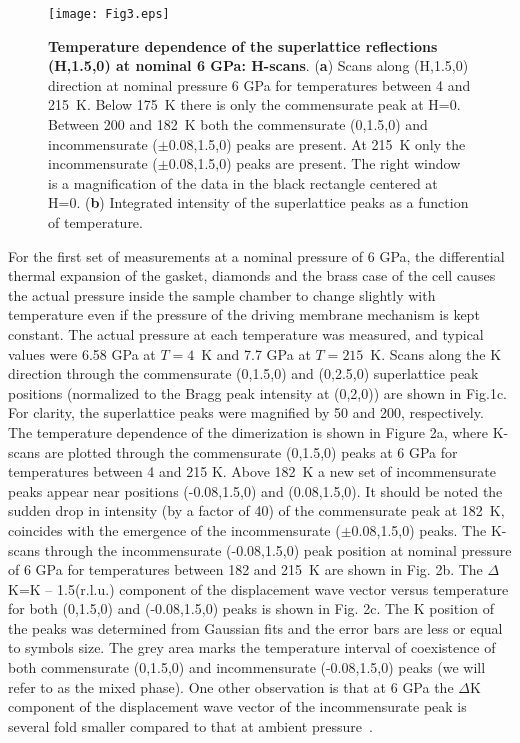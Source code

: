 \documentclass[preprint,superscriptaddress,amsmath,amssymb,aps,prl]{revtex4-1}
\begin{document}
\begin{center}
\begin{figure}
\begin{center}
\texttt{[image: Fig3.eps]}
\caption{\textbf{Temperature dependence of the superlattice reflections (H,1.5,0) at nominal 6 GPa: H-scans}. (\textbf{a}) Scans along (H,1.5,0) direction at nominal pressure 6 GPa for temperatures between 4 and 215~K. Below 175~K there is only the commensurate peak at H=0. Between 200 and 182~K both the commensurate (0,1.5,0) and incommensurate ($\pm$0.08,1.5,0) peaks are present. At 215~K only the incommensurate ($\pm$0.08,1.5,0) peaks are present. The right window is a magnification of the data in the black rectangle centered at H=0. (\textbf{b}) Integrated intensity of the superlattice peaks as a function of temperature.}
\label{fig:Fig3}
\end{center}
\end{figure}
\end{center}

For the first set of measurements at a nominal pressure of 6 GPa, the differential thermal expansion of the gasket, diamonds and the brass case of the cell causes the actual pressure inside the sample chamber to change slightly with temperature even if the pressure of the driving membrane mechanism is kept constant. The actual pressure at each temperature was measured, and typical values were 6.58 GPa at $T=4$~K and 7.7 GPa at $T=215$~K. Scans along the K direction through the commensurate (0,1.5,0) and (0,2.5,0) superlattice peak positions (normalized to the Bragg peak intensity at (0,2,0)) are shown in Fig.1c. For clarity, the superlattice peaks were magnified by 50 and 200, respectively. The temperature dependence of the dimerization is shown in Figure 2a, where K-scans are plotted through the commensurate (0,1.5,0) peaks at 6 GPa for temperatures between 4 and 215 K. Above 182~K a new set of incommensurate peaks appear near positions (-0.08,1.5,0) and (0.08,1.5,0). It should be noted the sudden drop in intensity (by a factor of 40) of the commensurate peak at 182~K, coincides with the emergence of the incommensurate ($\pm$0.08,1.5,0) peaks. The K-scans through the incommensurate (-0.08,1.5,0) peak position at nominal pressure of 6 GPa for temperatures between 182 and 215~K are shown in Fig. 2b. The $\Delta$K=K -- 1.5(r.l.u.) component of the displacement wave vector versus temperature for both (0,1.5,0) and (-0.08,1.5,0) peaks is shown in Fig. 2c. The K position of the peaks was determined from Gaussian fits and the error bars are less or equal to symbols size. The grey area marks the temperature interval of coexistence of both commensurate (0,1.5,0) and incommensurate (-0.08,1.5,0) peaks (we will refer to as the mixed phase). One other observation is that at 6 GPa the $\Delta$K component of the displacement wave vector of the incommensurate peak is several fold smaller compared to that at ambient pressure~\cite{Abel2007}.
\end{document}

